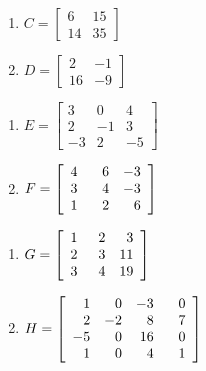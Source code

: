 \begin{multicols}{2}
\begin{enumerate}
\setcounter{enumi}{\value{HW}}

\item $C = \left[ \begin{array}{rr} 6 & 15 \\ 14 & 35 \end{array} \right]$
\item $D = \left[ \begin{array}{rr} 2 & -1 \\ 16 & -9 \end{array} \right]$ \label{matrixD}

\setcounter{HW}{\value{enumi}}
\end{enumerate}
\end{multicols}

\begin{multicols}{2}
\begin{enumerate}
\setcounter{enumi}{\value{HW}}

\item $E = \left[ \begin{array}{rrr} 3 & 0 & 4 \\ 2 & -1 & 3 \\ -3 & 2 & -5 \end{array} \right]$ \label{matrixE}
\item $F = \left[ \begin{array}{rrr} 4 & \hphantom{-}6 & -3 \\ 3 & 4 & -3 \\ 1 & 2 & 6 \end{array} \right]$

\setcounter{HW}{\value{enumi}}
\end{enumerate}
\end{multicols}

\begin{multicols}{2}
\begin{enumerate}
\setcounter{enumi}{\value{HW}}

\item $G = \left[ \begin{array}{rrr} 1 & \hphantom{1}2 & 3 \\ 2 & 3 & 11 \\ 3 & 4 & 19 \end{array} \right]$
\item $H = \left[ \begin{array}{rrrr} 1 & 0 & -3 & \hphantom{-}0 \\ 2 & -2 & 8 & 7 \\ -5 & 0 & 16 & 0 \\ 1 & 0 & 4 & 1 \end{array} \right]$ \label{findmatinverselast}

\setcounter{HW}{\value{enumi}}
\end{enumerate}
\end{multicols}



